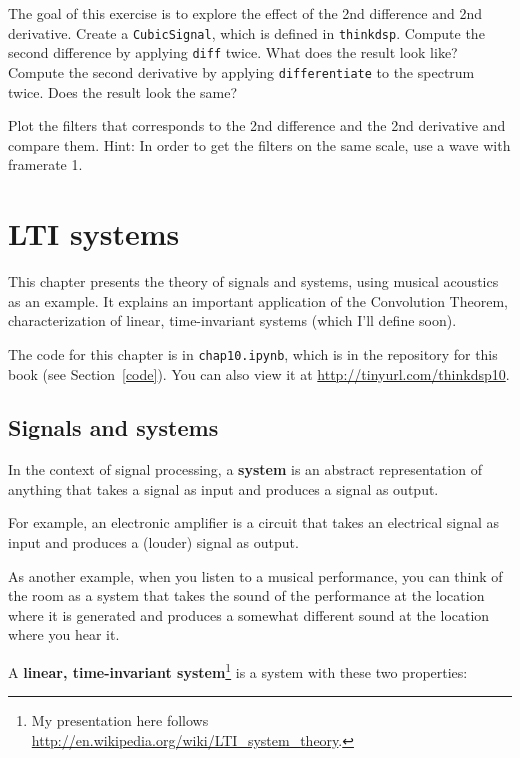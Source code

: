\documentclass[12pt]{book}
\begin{document}
\begin{exercise}
The goal of this exercise is to explore the effect of the 2nd
difference and 2nd derivative. Create a {\tt CubicSignal}, which is
defined in {\tt thinkdsp}. Compute the second difference by applying
{\tt diff} twice. What does the result look like?  Compute the second
derivative by applying {\tt differentiate} to the spectrum twice.
Does the result look the same?

Plot the filters that corresponds to the 2nd difference and the 2nd
derivative and compare them. Hint: In order to get the filters on the
same scale, use a wave with framerate 1.
\end{exercise}




\chapter{LTI systems}
\label{systems}

This chapter presents the theory of signals and systems, using
musical acoustics as an example.  It explains an
important application of the Convolution Theorem, characterization
of linear, time-invariant systems (which I'll define soon).

The code for this chapter is in {\tt chap10.ipynb}, which is in the
repository for this book (see Section~\ref{code}).
You can also view it at \url{http://tinyurl.com/thinkdsp10}.



\section{Signals and systems}

In the context of signal processing, a {\bf system} is an abstract
representation of anything that takes a signal as input and produces
a signal as output.

For example, an electronic amplifier is a circuit that takes an
electrical signal as input and produces a (louder) signal as output.

As another example, when you listen to a musical performance, you
can think of the room as a system that takes the sound of the
performance at the location where it is generated and produces a
somewhat different sound at the location where you hear it.

A {\bf linear, time-invariant system}\footnote{My presentation here
  follows \url{http://en.wikipedia.org/wiki/LTI_system_theory}.} is a
system with these two properties:
\end{document}
